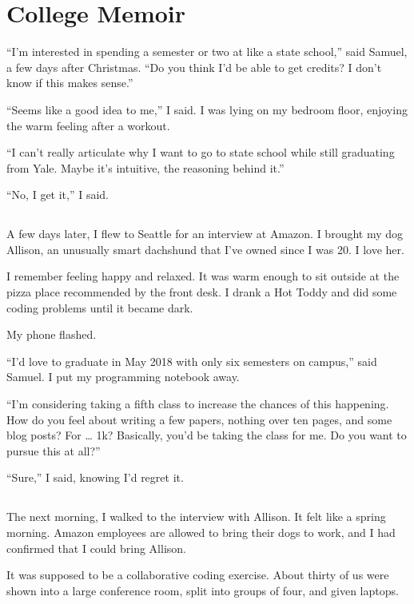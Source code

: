 \chapter{College Memoir}

``I'm interested in spending a semester or two at like a state school,'' said
Samuel, a few days after Christmas.  ``Do you think I'd be able to get credits?
I don't know if this makes sense.''

``Seems like a good idea to me,'' I said.  I was lying on my bedroom floor,
enjoying the warm feeling after a workout.

``I can't really articulate why I want to go to state school while still
graduating from Yale.   Maybe it's intuitive, the reasoning behind it.'' 

``No, I get it,'' I said.

\section{}

A few days later, I flew to Seattle for an interview at Amazon.  I brought my
dog Allison, an unusually smart dachshund that I've owned since I was 20.  I
love her.  

I remember feeling happy and relaxed.  It was warm enough to sit outside at the
pizza place recommended by the front desk.   I drank a Hot Toddy and did some
coding problems until it became dark.  

My phone flashed.

``I'd love to graduate in May 2018 with only six semesters on campus,'' said
Samuel.  I put my programming notebook away.

``I'm considering taking a fifth class to increase the chances of this
happening.  How do you feel about writing a few papers, nothing over ten pages,
and some blog posts?  For … 1k?  Basically, you'd be taking the class for me.
Do you want to pursue this at all?'' 

``Sure,'' I said, knowing I'd regret it.

\section{}

The next morning, I walked to the interview with Allison.  It felt like a spring
morning.  Amazon employees are allowed to bring their dogs to work, and I had
confirmed that I could bring Allison.

It was supposed to be a collaborative coding exercise.  About thirty of us were
shown into a large conference room, split into groups of four, and given
laptops.  

